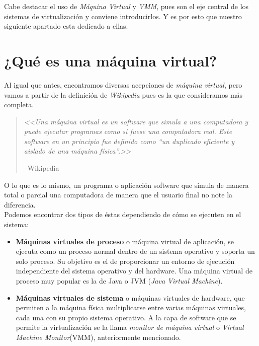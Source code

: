 \noindent Cabe destacar el uso de  \emph{Máquina Virtual} y \emph{VMM}, pues son el eje central de los sistemas de virtualización y conviene introducirlos. Y es por esto que nuestro siguiente apartado esta dedicado a ellas.

\section{¿Qué es una máquina virtual?}

\noindent Al igual que antes, encontramos diversas acepciones de \emph{máquina virtual}, pero vamos a partir de la definición de \emph{Wikipedia} pues es la que consideramos más completa.

\begin{quote}
\emph{<<Una máquina virtual es un software que simula a una computadora y puede ejecutar programas como si fuese una computadora real. Este software en un principio fue definido como \textquotedblleft un duplicado eficiente y aislado de una máquina física\textquotedblright.>>}
\begin{flushright}
--Wikipedia\cite{defmaqvirwiki}
\end{flushright}
\end{quote}

\noindent O lo que es lo mismo, un programa o aplicación software que simula de manera total o parcial una computadora de manera que el usuario final no note la diferencia.\\

\noindent Podemos encontrar dos tipos de éstas dependiendo de cómo se ejecuten en el sistema:

\begin{itemize}
\item \textbf{Máquinas virtuales de proceso} o máquina virtual de aplicación, se ejecuta como un proceso normal dentro de un sistema operativo y soporta un solo proceso. Su objetivo es el de proporcionar un entorno de ejecución independiente del sistema operativo y del hardware. Una máquina virtual de proceso muy popular es la de Java o \gls{JVM} (\emph{Java Virtual Machine}).
\item \textbf{Máquinas virtuales de sistema} o máquinas virtuales de hardware, que permiten a la máquina física multiplicarse entre varias máquinas virtuales, cada una con su propio sistema operativo. A la capa de software que se permite la virtualización se la llama \emph{monitor de máquina virtual} o \emph{Virtual Machine Monitor}(\gls{VMM}), anteriormente mencionado.
\end{itemize}


